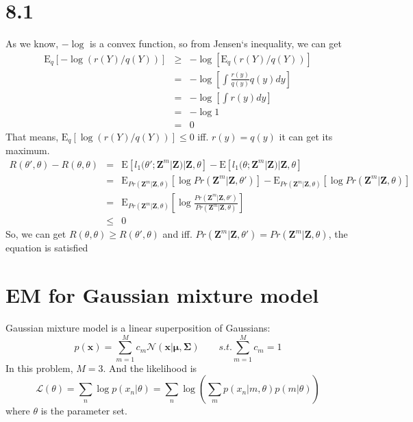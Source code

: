 \documentclass[11pt, oneside]{article}   	%
\begin{document}
\section{8.1}
As we know, $-\log$ is a convex function, so from Jensen`s inequality, we can get
\begin{eqnarray}
\mathrm{E}_q[ -\log(r(Y)/q(Y)) ] &\ge& -\log [ \mathrm{E}_q(r(Y)/q(Y)) ]\\
&=& -\log [\int \frac{r(y)}{q(y)}q(y)dy] \\
&=& -\log [\int r(y)dy ] \\
&=& -\log 1 \\
&=& 0
\end{eqnarray}
That means, $\mathrm{E}_q[ \log(r(Y)/q(Y)) ] \le 0 $ iff. $r(y) = q(y)$ it can get its maximum.
\begin{eqnarray}
R(\theta', \theta) - R(\theta, \theta) &=& \mathrm{E}[l_1(\theta' ; \mathbf{Z}^m | \mathbf{Z} ) | \mathbf{Z}, \theta ] - \mathrm{E}[l_1(\theta ; \mathbf{Z}^m | \mathbf{Z} ) | \mathbf{Z}, \theta ] \\
&=& \mathrm{E}_{Pr(\mathbf{Z}^m | \mathbf{Z}, \theta)} [\log Pr ( \mathbf{Z}^m | \mathbf{Z}, \theta' )] - \mathrm{E}_{Pr(\mathbf{Z}^m | \mathbf{Z}, \theta)} [\log Pr ( \mathbf{Z}^m | \mathbf{Z}, \theta )] \\
&=& \mathrm{E}_{Pr(\mathbf{Z}^m | \mathbf{Z}, \theta)} [\log \frac{Pr ( \mathbf{Z}^m | \mathbf{Z}, \theta' )}{Pr ( \mathbf{Z}^m | \mathbf{Z}, \theta )} ] \\
&\le& 0 
\end{eqnarray}
So, we can get $R(\theta, \theta) \ge R(\theta', \theta)$ and iff. $ Pr ( \mathbf{Z}^m | \mathbf{Z}, \theta' ) = Pr ( \mathbf{Z}^m | \mathbf{Z}, \theta )$, the equation is satisfied

\section{EM for Gaussian mixture model}
Gaussian mixture model is a linear superposition of Gaussians:
\begin{equation}
p(\mathbf{x}) = \sum_{m=1}^M c_m \mathcal{N} (\mathbf{x} | \mathbf{\mu}, \mathbf{\Sigma}) \qquad s.t. \sum_{m=1}^M c_m = 1
\end{equation}
In this problem, $M = 3$. And the likelihood is 
\begin{equation}
\mathcal{L}(\theta) = \sum_n \log p(x_n | \theta) = \sum_n \log ( \sum_m p(x_n|m, \theta) p(m|\theta) )
\end{equation}
where $\theta$ is the parameter set. 
\end{document}
